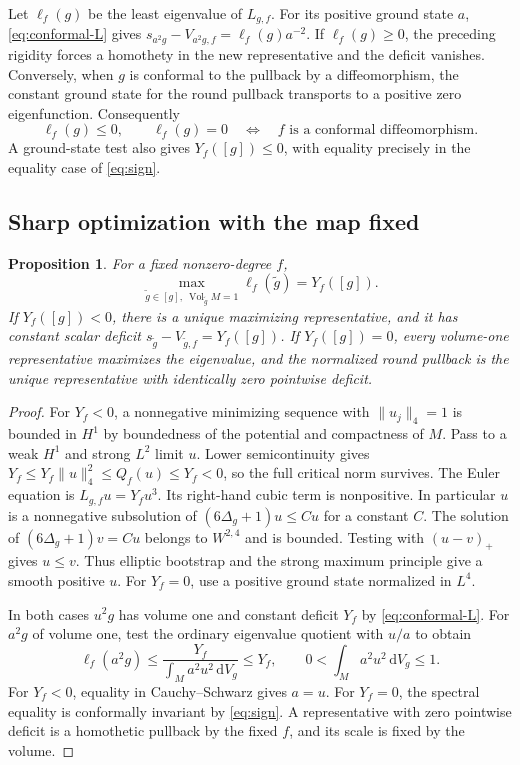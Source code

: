\documentclass[11pt]{article}
\numberwithin{equation}{section}
\newtheorem{proposition}[theorem]{Proposition}
\DeclareMathOperator{\Vol}{Vol}
\newcommand{\dd}{\mathrm{d}}
\newcommand{\norm}[1]{\lVert #1\rVert}
\newcommand{\dv}{\dd V_g}
\newcommand{\Yf}{Y_f([g])}
\begin{document}
Let \(\ell_f(g)\) be the least eigenvalue of \(L_{g,f}\).
For its positive ground state \(a\), \eqref{eq:conformal-L} gives
\(s_{a^2g}-V_{a^2g,f}=\ell_f(g)a^{-2}\).
If \(\ell_f(g)\ge0\), the preceding rigidity forces a homothety in
the new representative and the deficit vanishes. Conversely, when
\(g\) is conformal to the pullback by a diffeomorphism, the constant
ground state for the round pullback transports to a positive
zero eigenfunction. Consequently
\begin{equation}\label{eq:sign}
 \ell_f(g)\le0,\qquad
 \ell_f(g)=0\quad\Longleftrightarrow\quad
 f\text{ is a conformal diffeomorphism}.
\end{equation}
A ground-state test also gives \(\Yf\le0\), with equality
precisely in the equality case of \eqref{eq:sign}.

\subsection{Sharp optimization with the map fixed}

\begin{proposition}\label{prop:fixed-map}
For a fixed nonzero-degree \(f\),
\[
 \max_{\widetilde g\in[g],\ \Vol_{\widetilde g}M=1}
       \ell_f(\widetilde g)=\Yf .
\]
If \(\Yf<0\), there is a unique maximizing representative, and
it has constant scalar deficit \(s_{\widetilde g}-V_{\widetilde g,f}=\Yf\).
If \(\Yf=0\), every volume-one representative maximizes the
eigenvalue, and the normalized round pullback is the unique
representative with identically zero pointwise deficit.
\end{proposition}

\begin{proof}
For \(Y_f<0\), a nonnegative minimizing sequence with
\(\norm{u_j}_4=1\) is bounded in \(H^1\) by boundedness of the potential
and compactness of \(M\). Pass to a weak \(H^1\) and strong \(L^2\)
limit \(u\). Lower semicontinuity gives
\(Y_f\le Y_f\norm u_4^2\le Q_f(u)\le Y_f<0\), so the full critical
norm survives. The Euler equation is \(L_{g,f}u=Y_f u^3\).
Its right-hand cubic term is nonpositive. In particular \(u\)
is a nonnegative subsolution of \((6\Delta_g+1)u\le Cu\) for
a constant \(C\). The solution of \((6\Delta_g+1)v=Cu\)
belongs to \(W^{2,4}\) and is bounded. Testing with \((u-v)_+\)
gives \(u\le v\). Thus elliptic bootstrap and the strong maximum
principle give a smooth positive \(u\). For \(Y_f=0\), use a
positive ground state normalized in \(L^4\).

In both cases \(u^2g\) has volume one and constant deficit \(Y_f\)
by \eqref{eq:conformal-L}. For \(a^2g\) of volume one, test the
ordinary eigenvalue quotient with \(u/a\) to obtain
\[
 \ell_f(a^2g)\le\frac{Y_f}{\int_M a^2u^2\,\dv}\le Y_f ,
 \qquad 0<\int_Ma^2u^2\,\dv\le1 .
\]
For \(Y_f<0\), equality in Cauchy--Schwarz gives \(a=u\).
For \(Y_f=0\), the spectral equality is conformally invariant by
\eqref{eq:sign}. A representative with zero pointwise deficit is a
homothetic pullback by the fixed \(f\), and its scale is fixed by
the volume.
\end{proof}
\end{document}
